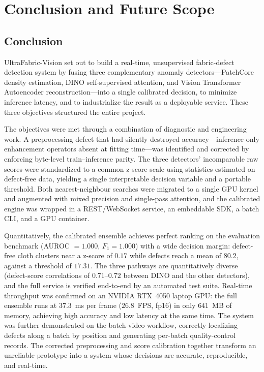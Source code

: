 \chapter{Conclusion and Future Scope}

\section{Conclusion}

UltraFabric-Vision set out to build a real-time, unsupervised fabric-defect detection system by fusing three complementary anomaly detectors---PatchCore density estimation, DINO self-supervised attention, and Vision Transformer Autoencoder reconstruction---into a single calibrated decision, to minimize inference latency, and to industrialize the result as a deployable service. These three objectives structured the entire project.

The objectives were met through a combination of diagnostic and engineering work. A preprocessing defect that had silently destroyed accuracy---inference-only enhancement operators absent at fitting time---was identified and corrected by enforcing byte-level train--inference parity. The three detectors' incomparable raw scores were standardized to a common z-score scale using statistics estimated on defect-free data, yielding a single interpretable decision variable and a portable threshold. Both nearest-neighbour searches were migrated to a single GPU kernel and augmented with mixed precision and single-pass attention, and the calibrated engine was wrapped in a REST/WebSocket service, an embeddable SDK, a batch CLI, and a GPU container.

Quantitatively, the calibrated ensemble achieves perfect ranking on the evaluation benchmark (AUROC $=1.000$, $F_1 = 1.000$) with a wide decision margin: defect-free cloth clusters near a z-score of $0.17$ while defects reach a mean of $80.2$, against a threshold of $17.31$. The three pathways are quantitatively diverse (defect-score correlations of $0.71$--$0.72$ between DINO and the other detectors), and the full service is verified end-to-end by an automated test suite. Real-time throughput was confirmed on an NVIDIA RTX~4050 laptop GPU: the full ensemble runs at $37.3$~ms per frame ($26.8$~FPS, fp16) in only $641$~MB of memory, achieving high accuracy and low latency at the same time. The system was further demonstrated on the batch-video workflow, correctly localizing defects along a batch by position and generating per-batch quality-control records. The corrected preprocessing and score calibration together transform an unreliable prototype into a system whose decisions are accurate, reproducible, and real-time.

